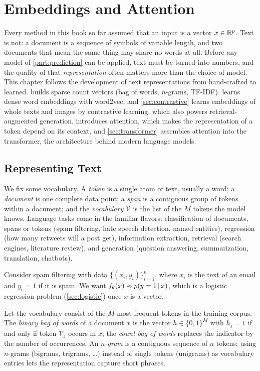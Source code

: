 \chapter{Embeddings and Attention}\label{ch:attention}

Every method in this book so far assumed that an input is a vector $x\in\mathbb{R}^p$. Text is not: a document is a sequence of symbols of variable length, and two documents that mean the same thing may share no words at all. Before any model of \cref{part:prediction} can be applied, text must be turned into numbers, and the quality of that \emph{representation} often matters more than the choice of model. This chapter follows the development of text representations from hand-crafted to learned.  builds sparse count vectors (bag of words, $n$-grams, TF-IDF).  learns dense word embeddings with word2vec, and \cref{sec:contrastive} learns embeddings of whole texts and images by contrastive learning, which also powers retrieval-augmented generation.  introduces attention, which makes the representation of a token depend on its context, and \cref{sec:transformer} assembles attention into the transformer, the architecture behind modern language models.

\section{Representing Text}\label{sec:text-representation}

We fix some vocabulary. A \emph{token} is a single atom of text, usually a word; a \emph{document} is one complete data point; a \emph{span} is a contiguous group of tokens within a document; and the \emph{vocabulary} $\mathcal V$ is the list of the $M$ tokens the model knows. Language tasks come in the familiar flavors: classification of documents, spans or tokens (spam filtering, hate speech detection, named entities), regression (how many retweets will a post get), information extraction, retrieval (search engines, literature review), and generation (question answering, summarization, translation, chatbots).

Consider spam filtering with data $\{(x_i,y_i)\}_{i=1}^n$, where $x_i$ is the text of an email and $y_i=1$ if it is spam. We want $f_\theta(x)\approx p(y=1\,|\, x)$, which is a logistic regression problem (\cref{sec:logistic}) once $x$ is a vector.

\begin{definition}\label{def:bow}
Let the vocabulary consist of the $M$ most frequent tokens in the training corpus. The \emph{binary bag of words} of a document $x$ is the vector $h\in\{0,1\}^M$ with $h_j=1$ if and only if token $\mathcal V_j$ occurs in $x$; the \emph{count bag of words} replaces the indicator by the number of occurrences. An \emph{$n$-gram} is a contiguous sequence of $n$ tokens; using $n$-grams (bigrams, trigrams, \dots) instead of single tokens (unigrams) as vocabulary entries lets the representation capture short phrases.
\end{definition}

